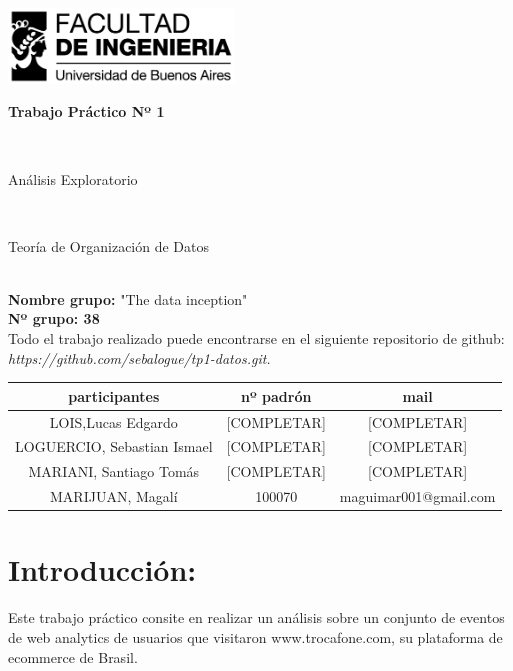 \documentclass[titlepage,a4paper]{article}
\begin{document}
	\begin{titlepage}
		\hfill\includegraphics[width=6cm]{logofiuba.jpg}
		\center
		\vfill
		\vfill
		\begin{center}
			\begin{Huge}\textbf{Trabajo Práctico Nº 1}\end{Huge}\\
			\vfill
			\begin{huge}Análisis Exploratorio\end{huge}\\
			\vfill
			\begin{Large} Teoría de Organización de Datos\end{Large}\\

			\textbf{Nombre grupo:} "The data inception" \\
			\textbf{Nº grupo: 38}\\
				Todo el trabajo realizado puede encontrarse en el siguiente repositorio de github:\textit{ https://github.com/sebalogue/tp1-datos.git. }
	
			\vfill
			\begin{tabular}{|c|c|c|}
				\hline
				participantes & nº padrón & mail \\ \hline
				LOIS,Lucas Edgardo &[COMPLETAR] &  [COMPLETAR] \\ \hline		
				LOGUERCIO, Sebastian Ismael &[COMPLETAR] &  [COMPLETAR] \\ \hline
				MARIANI, Santiago Tomás &[COMPLETAR] &  [COMPLETAR] \\ \hline
				MARIJUAN, Magalí & 100070 & maguimar001@gmail.com\\ \hline
				
			\end{tabular}
			\vfill
			\vfill
			\vfill
			\vfill
			\vfill
			\vfill
		\end{center}
	
	\end{titlepage}

	\tableofcontents
	\newpage
	
	\section{Introducción:}
	Este trabajo práctico consite en realizar un análisis sobre un conjunto de eventos de web analytics de usuarios que visitaron www.trocafone.com, su plataforma de ecommerce de Brasil.
	
\end{document}
